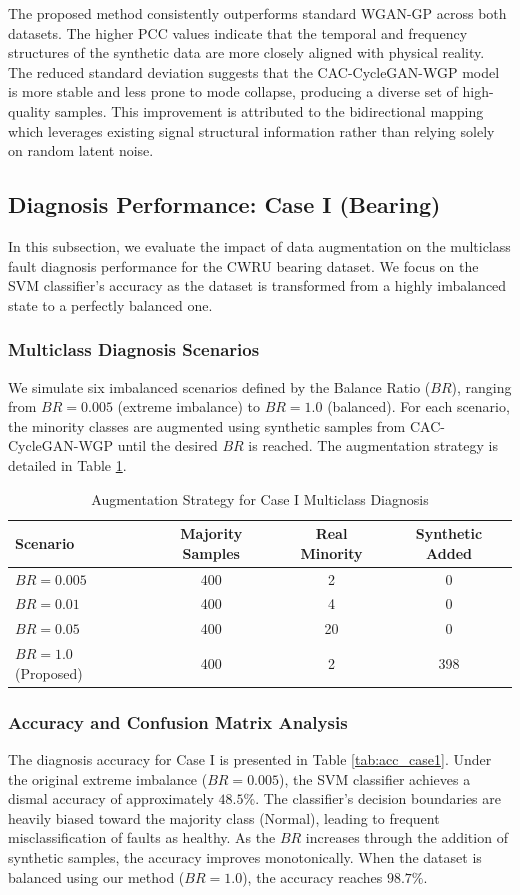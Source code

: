The proposed method consistently outperforms standard WGAN-GP across both datasets. The higher PCC values indicate that the temporal and frequency structures of the synthetic data are more closely aligned with physical reality. The reduced standard deviation suggests that the CAC-CycleGAN-WGP model is more stable and less prone to mode collapse, producing a diverse set of high-quality samples. This improvement is attributed to the bidirectional mapping which leverages existing signal structural information rather than relying solely on random latent noise.

\subsection{Diagnosis Performance: Case I (Bearing)}
In this subsection, we evaluate the impact of data augmentation on the multiclass fault diagnosis performance for the CWRU bearing dataset. We focus on the SVM classifier's accuracy as the dataset is transformed from a highly imbalanced state to a perfectly balanced one.

\subsubsection{Multiclass Diagnosis Scenarios}
We simulate six imbalanced scenarios defined by the Balance Ratio ($BR$), ranging from $BR=0.005$ (extreme imbalance) to $BR=1.0$ (balanced). For each scenario, the minority classes are augmented using synthetic samples from CAC-CycleGAN-WGP until the desired $BR$ is reached. The augmentation strategy is detailed in Table \ref{tab:aug_case1}.

\begin{table}[htbp]
\centering
\caption{Augmentation Strategy for Case I Multiclass Diagnosis}
\label{tab:aug_case1}
\begin{tabular}{lccc}
\hline
\textbf{Scenario} & \textbf{Majority Samples} & \textbf{Real Minority} & \textbf{Synthetic Added} \\ \hline
$BR = 0.005$ & 400 & 2 & 0 \\
$BR = 0.01$  & 400 & 4 & 0 \\
$BR = 0.05$  & 400 & 20 & 0 \\
$BR = 1.0$ (Proposed) & 400 & 2 & 398 \\
\hline
\end{tabular}
\end{table}

\subsubsection{Accuracy and Confusion Matrix Analysis}
The diagnosis accuracy for Case I is presented in Table \ref{tab:acc_case1}. Under the original extreme imbalance ($BR=0.005$), the SVM classifier achieves a dismal accuracy of approximately $48.5\%$. The classifier's decision boundaries are heavily biased toward the majority class (Normal), leading to frequent misclassification of faults as healthy. As the $BR$ increases through the addition of synthetic samples, the accuracy improves monotonically. When the dataset is balanced using our method ($BR=1.0$), the accuracy reaches $98.7\%$.

